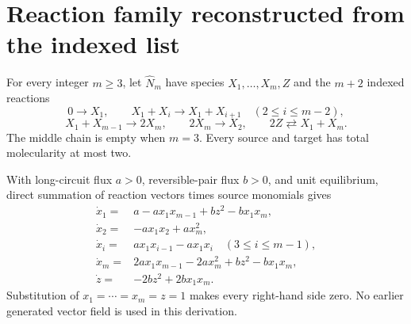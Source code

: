 \section*{Reaction family reconstructed from the indexed list}
For every integer $m\geq3$, let $\widehat N_m$ have species
$X_1,\ldots,X_m,Z$ and the $m+2$ indexed reactions
\[
0\to X_1,
\qquad
X_1+X_i\to X_1+X_{i+1}\quad(2\leq i\leq m-2),
\]
\[
X_1+X_{m-1}\to2X_m,
\qquad
2X_m\to X_2,
\qquad
2Z\rightleftarrows X_1+X_m.
\]
The middle chain is empty when $m=3$.  Every source and target has total
molecularity at most two.

With long-circuit flux $a>0$, reversible-pair flux $b>0$, and unit
equilibrium, direct summation of reaction vectors times source monomials gives
\begin{align*}
\dot x_1={}&a-a x_1x_{m-1}+b z^2-bx_1x_m,\\
\dot x_2={}&-a x_1x_2+a x_m^2,\\
\dot x_i={}&a x_1x_{i-1}-a x_1x_i\quad(3\leq i\leq m-1),\\
\dot x_m={}&2a x_1x_{m-1}-2a x_m^2+bz^2-bx_1x_m,\\
\dot z={}&-2bz^2+2bx_1x_m.
\end{align*}
Substitution of $x_1=\cdots=x_m=z=1$ makes every right-hand side zero.
No earlier generated vector field is used in this derivation.
